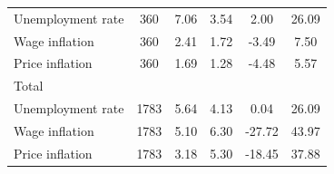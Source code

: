 \begin{table}[htbp]
\begin{tabular}{l*{1}{ccccc}}
Unemployment rate   &         360&        7.06&        3.54&        2.00&       26.09\\
Wage inflation      &         360&        2.41&        1.72&       -3.49&        7.50\\
Price inflation     &         360&        1.69&        1.28&       -4.48&        5.57\\
\hline
Total               &            &            &            &            &            \\
Unemployment rate   &        1783&        5.64&        4.13&        0.04&       26.09\\
Wage inflation      &        1783&        5.10&        6.30&      -27.72&       43.97\\
Price inflation     &        1783&        3.18&        5.30&      -18.45&       37.88\\
\hline\hline
\end{tabular}
\end{table}
